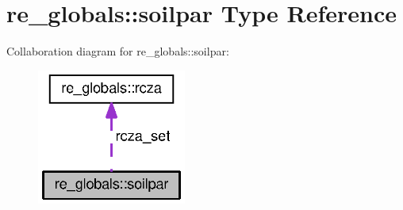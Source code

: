 \section{re\+\_\+globals\+:\+:soilpar Type Reference}
\label{structre__globals_1_1soilpar}


Collaboration diagram for re\+\_\+globals\+:\+:soilpar\+:\nopagebreak
\begin{figure}[H]
\begin{center}
\leavevmode
\includegraphics[width=139pt]{structre__globals_1_1soilpar__coll__graph}
\end{center}
\end{figure}
